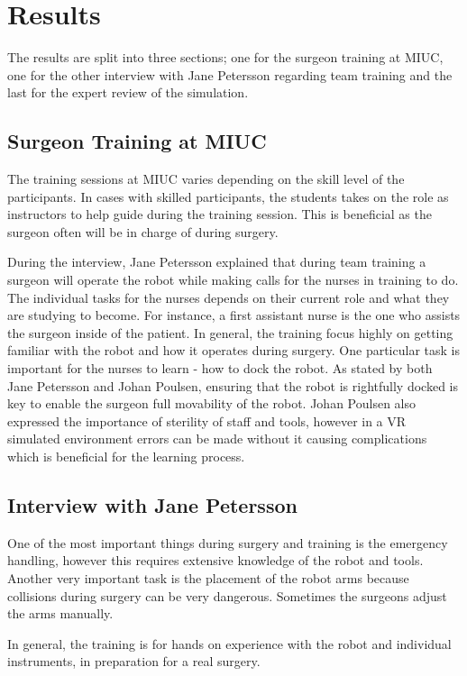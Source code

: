 \section*{Results}
The results are split into three sections; one for the surgeon training at MIUC, one for the other interview with Jane Petersson regarding team training and the last for the expert review of the simulation.

\subsection*{Surgeon Training at MIUC}
The training sessions at MIUC varies depending on the skill level of the participants. In cases with skilled participants, the students takes on the role as instructors to help guide during the training session. This is beneficial as the surgeon often will be in charge of during surgery.

During the interview, Jane Petersson explained that during team training a surgeon will operate the robot while making calls for the nurses in training to do. The individual tasks for the nurses depends on their current role and what they are studying to become. For instance, a first assistant nurse is the one who assists the surgeon inside of the patient. In general, the training focus highly on getting familiar with the robot and how it operates during surgery. One particular task is important for the nurses to learn - how to dock the robot. As stated by both Jane Petersson and Johan Poulsen, ensuring that the robot is rightfully docked is key to enable the surgeon full movability of the robot. Johan Poulsen also expressed the importance of sterility of staff and tools, however in a VR simulated environment errors can be made without it causing complications which is beneficial for the learning process.

\subsection*{Interview with Jane Petersson}
One of the most important things during surgery and training is the emergency handling, however this requires extensive knowledge of the robot and tools. Another very important task is the placement of the robot arms because collisions during surgery can be very dangerous. Sometimes the surgeons adjust the arms manually.

In general, the training is for hands on experience with the robot and individual instruments, in preparation for a real surgery.

